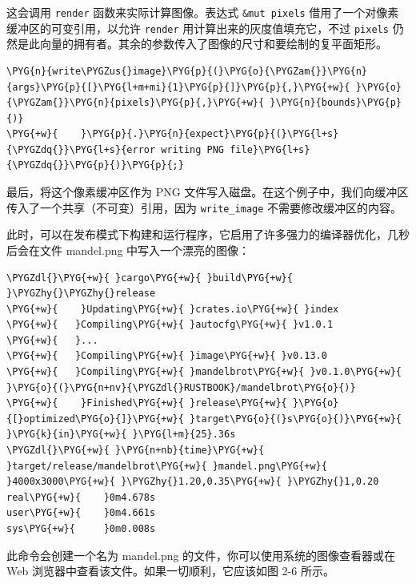 这会调用 \texttt{render} 函数来实际计算图像。表达式 \texttt{\&mut pixels} 借用了一个对像素缓冲区的可变引用，以允许 \texttt{render} 用计算出来的灰度值填充它，不过 \texttt{pixels} 仍然是此向量的拥有者。其余的参数传入了图像的尺寸和要绘制的复平面矩形。

\begin{Verbatim}[commandchars=\\\{\},breaklines=true,breakanywhere=true,fontsize=\codefont,xleftmargin=17bp]
\PYG{n}{write\PYGZus{}image}\PYG{p}{(}\PYG{o}{\PYGZam{}}\PYG{n}{args}\PYG{p}{[}\PYG{l+m+mi}{1}\PYG{p}{]}\PYG{p}{,}\PYG{+w}{ }\PYG{o}{\PYGZam{}}\PYG{n}{pixels}\PYG{p}{,}\PYG{+w}{ }\PYG{n}{bounds}\PYG{p}{)}
\PYG{+w}{    }\PYG{p}{.}\PYG{n}{expect}\PYG{p}{(}\PYG{l+s}{\PYGZdq{}}\PYG{l+s}{error writing PNG file}\PYG{l+s}{\PYGZdq{}}\PYG{p}{)}\PYG{p}{;}
\end{Verbatim}

最后，将这个像素缓冲区作为 PNG 文件写入磁盘。在这个例子中，我们向缓冲区传入了一个共享（不可变）引用，因为 \texttt{write\_image} 不需要修改缓冲区的内容。

此时，可以在发布模式下构建和运行程序，它启用了许多强力的编译器优化，几秒后会在文件 mandel.png 中写入一个漂亮的图像：

\begin{Verbatim}[commandchars=\\\{\},breaklines=true,breakanywhere=true,fontsize=\codefont,xleftmargin=17bp]
\PYGZdl{}\PYG{+w}{ }cargo\PYG{+w}{ }build\PYG{+w}{ }\PYGZhy{}\PYGZhy{}release
\PYG{+w}{    }Updating\PYG{+w}{ }crates.io\PYG{+w}{ }index
\PYG{+w}{   }Compiling\PYG{+w}{ }autocfg\PYG{+w}{ }v1.0.1
\PYG{+w}{   }...
\PYG{+w}{   }Compiling\PYG{+w}{ }image\PYG{+w}{ }v0.13.0
\PYG{+w}{   }Compiling\PYG{+w}{ }mandelbrot\PYG{+w}{ }v0.1.0\PYG{+w}{ }\PYG{o}{(}\PYG{n+nv}{\PYGZdl{}RUSTBOOK}/mandelbrot\PYG{o}{)}
\PYG{+w}{    }Finished\PYG{+w}{ }release\PYG{+w}{ }\PYG{o}{[}optimized\PYG{o}{]}\PYG{+w}{ }target\PYG{o}{(}s\PYG{o}{)}\PYG{+w}{ }\PYG{k}{in}\PYG{+w}{ }\PYG{l+m}{25}.36s
\PYGZdl{}\PYG{+w}{ }\PYG{n+nb}{time}\PYG{+w}{ }target/release/mandelbrot\PYG{+w}{ }mandel.png\PYG{+w}{ }4000x3000\PYG{+w}{ }\PYGZhy{}1.20,0.35\PYG{+w}{ }\PYGZhy{}1,0.20
real\PYG{+w}{    }0m4.678s
user\PYG{+w}{    }0m4.661s
sys\PYG{+w}{     }0m0.008s
\end{Verbatim}

此命令会创建一个名为 mandel.png 的文件，你可以使用系统的图像查看器或在 Web 浏览器中查看该文件。如果一切顺利，它应该如图 2-6 所示。


